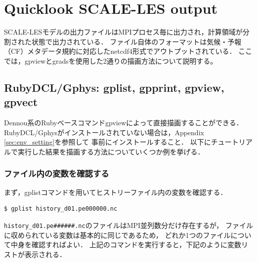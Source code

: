 \section{Quicklook SCALE-LES output}

SCALE-LESモデルの出力ファイルはMPIプロセス毎に出力され，計算領域が分割された状態で出力されている．
ファイル自体のフォーマットは気候・予報（CF）メタデータ規約に対応したnetcdf4形式でアウトプットされている．
ここでは，gpviewとgradsを使用した2通りの描画方法について説明する。

\subsection{RubyDCL/Gphys: gplist, gpprint, gpview, gpvect}

Dennou系のRubyベースコマンドgpviewによって直接描画することができる．
RubyDCL/Gphysがインストールされていない場合は，Appendix \ref{sec:env_setting}を参照して
事前にインストールすること．
以下にチュートリアルで実行した結果を描画する方法についていくつか例を挙げる．


\subsubsection{ファイル内の変数を確認する}

まず，gplistコマンドを用いてヒストリーファイル内の変数を確認する．

\begin{verbatim}
$ gplist history_d01.pe000000.nc
\end{verbatim}

\verb|history_d01.pe######.nc|のファイルはMPI並列数分だけ存在するが，
ファイルに収められている変数は基本的に同じであるため，
どれか1つのファイルについて中身を確認すればよい．
上記のコマンドを実行すると，下記のように変数リストが表示される．

